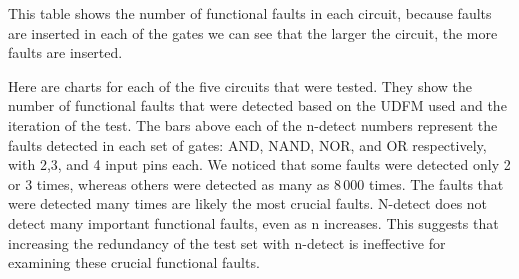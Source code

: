 \documentclass[12pt]{article}
\begin{document}
This table shows the number of functional faults in each circuit, because faults are inserted in each of the gates we can see that the larger the circuit, the more faults are inserted.

Here are charts for each of the five circuits that were tested. They show the number of functional faults that were detected based on the UDFM used and the iteration of the test. The bars above each of the n-detect numbers represent the faults detected in each set of gates: AND, NAND, NOR, and OR respectively, with 2,3, and 4 input pins each. We noticed that some faults were detected only 2 or 3 times, whereas others were detected as many as 8\,000 times. The faults that were detected many times are likely the most crucial faults. N-detect does not detect many important functional faults, even as n increases. This suggests that increasing the redundancy of the test set with n-detect is ineffective for examining these crucial functional faults.  
\end{document}
